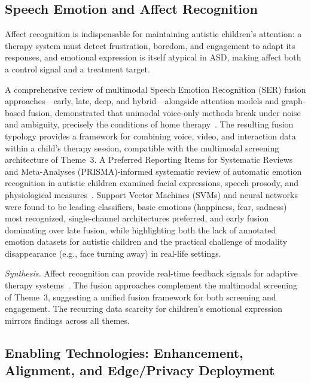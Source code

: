 \documentclass[conference]{IEEEtran}
\begin{document}
\subsection{Speech Emotion and Affect Recognition}

Affect recognition is indispensable for maintaining autistic children's attention: a therapy system must detect frustration, boredom, and engagement to adapt its responses, and emotional expression is itself atypical in ASD, making affect both a control signal and a treatment target.

A comprehensive review of multimodal Speech Emotion Recognition (SER) fusion approaches---early, late, deep, and hybrid---alongside attention models and graph-based fusion, demonstrated that unimodal voice-only methods break under noise and ambiguity, precisely the conditions of home therapy~\cite{ref18}. The resulting fusion typology provides a framework for combining voice, video, and interaction data within a child's therapy session, compatible with the multimodal screening architecture of Theme~3. A Preferred Reporting Items for Systematic Reviews and Meta-Analyses (PRISMA)-informed systematic review of automatic emotion recognition in autistic children examined facial expressions, speech prosody, and physiological measures~\cite{ref19}. Support Vector Machines (SVMs) and neural networks were found to be leading classifiers, basic emotions (happiness, fear, sadness) most recognized, single-channel architectures preferred, and early fusion dominating over late fusion, while highlighting both the lack of annotated emotion datasets for autistic children and the practical challenge of modality disappearance (e.g., face turning away) in real-life settings.

\emph{Synthesis.} Affect recognition can provide real-time feedback signals for adaptive therapy systems~\cite{ref18,ref19}. The fusion approaches complement the multimodal screening of Theme~3, suggesting a unified fusion framework for both screening and engagement. The recurring data scarcity for children's emotional expression mirrors findings across all themes.

\subsection{Enabling Technologies: Enhancement, Alignment, and Edge/Privacy Deployment}
\end{document}
